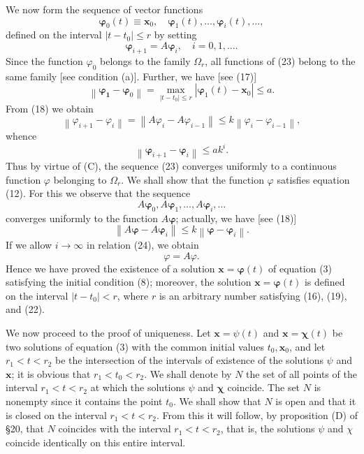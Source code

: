 \documentclass[10pt,a5paper]{book}
\makeatletter
\theoremstyle{plain}
\theoremstyle{definition}
\theoremstyle{remark}
\renewenvironment{proof}[1][\proofname]{\par
  \pushQED{\qed}%
  \normalfont\topsep6\p@\@plus6\p@\relax
  \trivlist
  \item\relax{\itshape #1\@addpunct{.}}\hspace\labelsep\ignorespaces
}{\popQED\endtrivlist\@endpefalse}
\makeatother
\begin{document}
\begin{proof}[Proof of Theorem 2]
We now form the sequence of vector functions
\begin{equation*}
\boldsymbol{\varphi}_{0}(t) \equiv \boldsymbol{x}_{0}, \quad \boldsymbol{\varphi}_{1}(t), \ldots, \boldsymbol{\varphi}_{i}(t), \ldots, \tag{23}
\end{equation*}
defined on the interval $\left|t-t_{0}\right| \leq r$ by setting
\begin{equation*}
\boldsymbol{\varphi}_{i+1}=A \boldsymbol{\varphi}_{i}, \quad i=0,1, \ldots . \tag{24}
\end{equation*}
Since the function $\varphi_{0}$ belongs to the family $\Omega_{r}$, all functions of (23) belong to the same family [see condition (a)]. Further, we have [see (17)]
\[
\left\|\boldsymbol{\varphi}_{\mathbf{1}}-\boldsymbol{\varphi}_{0}\right\|=\max _{\left|t-t_{0}\right| \leq r}\left|\boldsymbol{\varphi}_{1}(t)-\mathbf{x}_{0}\right| \leq a .
\]
From (18) we obtain
\[
\left\|\varphi_{i+1}-\varphi_{i}\right\|=\left\|A \varphi_{i}-A \varphi_{i-1}\right\| \leq k\left\|\varphi_{i}-\varphi_{i-1}\right\|,
\]
whence
\begin{equation*}
\left\|\boldsymbol{\varphi}_{i+1}-\boldsymbol{\varphi}_{i}\right\| \leq a k^{i} . \tag{25}
\end{equation*}
Thus by virtue of (C), the sequence (23) converges uniformly to a continuous function $\varphi$ belonging to $\Omega_{r}$. We shall show that the function $\varphi$ satisfies equation (12). For this we observe that the sequence
\[
A \boldsymbol{\varphi}_{0}, A \boldsymbol{\varphi}_{1}, \ldots, A \boldsymbol{\varphi}_{i}, \ldots
\]
converges uniformly to the function $A \boldsymbol{\varphi}$; actually, we have [see (18)]
\[
\left\|A \boldsymbol{\varphi}-A \boldsymbol{\varphi}_{i}\right\| \leq k\left\|\boldsymbol{\varphi}-\boldsymbol{\varphi}_{i}\right\| .
\]
If we allow $i \rightarrow \infty$ in relation (24), we obtain
\[
\varphi=A \varphi .
\]
Hence we have proved the existence of a solution $\mathbf{x}=\boldsymbol{\varphi}(t)$ of equation (3) satisfying the initial condition (8); moreover, the solution $\mathbf{x}=\boldsymbol{\varphi}(t)$ is defined on the interval $\left|t-t_{0}\right|<r$, where $r$ is an arbitrary number satisfying (16), (19), and (22).

We now proceed to the proof of uniqueness. Let $\mathbf{x}=\psi(t)$ and $\mathbf{x}=\boldsymbol{\chi}(t)$ be two solutions of equation (3) with the common initial values $t_{0}, \mathbf{x}_{0}$, and let $r_{1}<t<r_{2}$ be the intersection of the intervals of existence of the solutions $\psi$ and $\boldsymbol{x}$; it is obvious that $r_{1}<t_{0}<r_{2}$. We shall denote by $N$ the set of all points of the interval $r_{1}<t<r_{2}$ at which the solutions $\psi$ and $\boldsymbol{\chi}$ coincide. The set $N$ is nonempty since it contains the point $t_{0}$. We shall show that $N$ is open and that it is closed on the interval $r_{1}<t<r_{2}$. From this it will follow, by proposition (D) of §20, that $N$ coincides with the interval $r_{1}<t<r_{2}$, that is, the solutions $\psi$ and $\chi$ coincide identically on this entire interval.


\end{proof}
\end{document}
